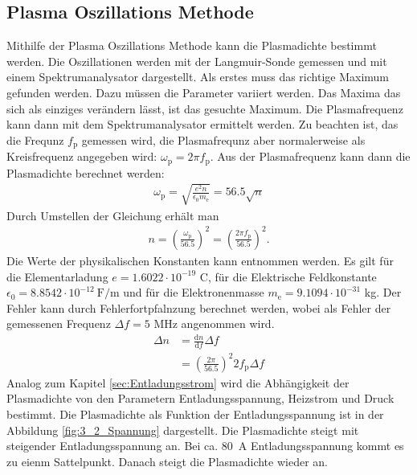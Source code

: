 \subsection{Plasma Oszillations Methode}
Mithilfe der Plasma  Oszillations Methode kann die Plasmadichte bestimmt werden. Die Oszillationen werden mit der Langmuir-Sonde gemessen und mit einem Spektrumanalysator dargestellt. Als erstes muss das richtige Maximum gefunden werden. Dazu müssen die Parameter variiert werden. Das Maxima das sich als einziges verändern lässt, ist das gesuchte Maximum. Die Plasmafrequenz kann dann mit dem Spektrumanalysator ermittelt werden. Zu beachten ist, das die Frequnz $f_{\mathrm{p}}$ gemessen wird, die Plasmafrequnz aber normalerweise als Kreisfrequenz angegeben wird: $\omega_{\mathrm{p}}= 2 \pi f_{\mathrm{p}}$.  Aus der Plasmafrequenz  kann dann die Plasmadichte berechnet werden:
\begin{align}
  \omega_{\mathrm{p}}=\sqrt{\frac{e^2 n}{\epsilon_0 m_{\mathrm{e}}}} = 56.5 \sqrt{n}
\end{align}
Durch Umstellen der Gleichung erhält man
\begin{align}
  n=\left( \frac{\omega_{\mathrm{p}}}{56.5} \right)^2=\left( \frac{2 \pi f_{\mathrm{p}}}{56.5} \right)^2.
\end{align}
Die Werte der physikalischen Konstanten kann \cite{wiki:Konstanten} entnommen werden. Es gilt für die Elementarladung $e= 1.6022 \cdot 10^{-19}$ C, für die Elektrische Feldkonstante $\epsilon_0= 8.8542 \cdot 10^{-12}\ \mathrm{F}/\mathrm{m}$ und für die Elektronenmasse $m_{\mathrm{e}}=9.1094 \cdot 10^{-31}$ kg.
Der Fehler kann durch Fehlerfortpfalnzung berechnet werden, wobei als Fehler der gemessenen Frequenz  $\Delta f= 5$ MHz angenommen wird.  
\begin{align}
  \Delta n &= \frac{\mathrm{d} n}{\mathrm{d} f} \Delta f \\
  &=\left( \frac{2 \pi}{56.5} \right)^2 2 f_{\mathrm{p}} \Delta f
\end{align}
Analog zum Kapitel \ref{sec:Entladungsstrom} wird die Abhängigkeit der Plasmadichte von den Parametern Entladungsspannung, Heizstrom und Druck bestimmt. Die Plasmadichte als Funktion der Entladungsspannung ist in der Abbildung \ref{fig:3_2_Spannung} dargestellt. Die Plasmadichte steigt mit steigender Entladungsspannung an. Bei ca. \SI{80}{A} Entladungsspannung kommt es zu eienm Sattelpunkt. Danach steigt die Plasmadichte wieder an. 
